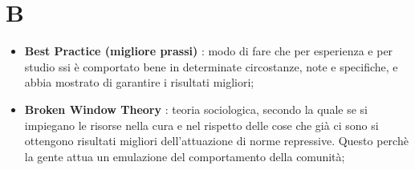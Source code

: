 % 
%
%

\section{B}

\begin{itemize}
	\item \textbf{Best Practice (migliore prassi)} : modo di fare che per esperienza e per studio ssi è comportato bene in determinate circostanze, note e specifiche, e abbia mostrato di garantire i risultati migliori;

	\item \textbf{Broken Window Theory} : teoria sociologica, secondo la quale se si impiegano le risorse nella cura e nel rispetto delle cose che già ci sono si ottengono risultati migliori dell'attuazione di norme repressive. Questo perchè la gente attua un emulazione del comportamento della comunità;

\end{itemize}